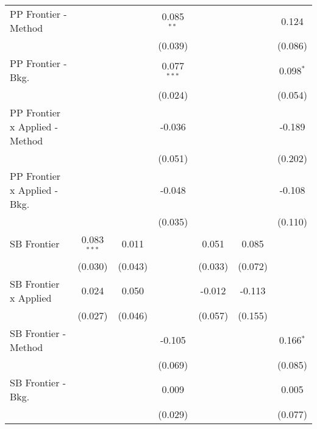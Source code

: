 \begin{tabular}{lcccccc}
   PP Frontier - Method           &               &               & 0.085$^{**}$  &               &              & 0.124\\   
                                  &               &               & (0.039)       &               &              & (0.086)\\   
   PP Frontier - Bkg.             &               &               & 0.077$^{***}$ &               &              & 0.098$^{*}$\\   
                                  &               &               & (0.024)       &               &              & (0.054)\\   
   PP Frontier x Applied - Method &               &               & -0.036        &               &              & -0.189\\   
                                  &               &               & (0.051)       &               &              & (0.202)\\   
   PP Frontier x Applied - Bkg.   &               &               & -0.048        &               &              & -0.108\\   
                                  &               &               & (0.035)       &               &              & (0.110)\\   
   SB Frontier                    & 0.083$^{***}$ & 0.011         &               & 0.051         & 0.085        &   \\   
                                  & (0.030)       & (0.043)       &               & (0.033)       & (0.072)      &   \\   
   SB Frontier x Applied          & 0.024         & 0.050         &               & -0.012        & -0.113       &   \\   
                                  & (0.027)       & (0.046)       &               & (0.057)       & (0.155)      &   \\   
   SB Frontier - Method           &               &               & -0.105        &               &              & 0.166$^{*}$\\   
                                  &               &               & (0.069)       &               &              & (0.085)\\   
   SB Frontier - Bkg.             &               &               & 0.009         &               &              & 0.005\\   
                                  &               &               & (0.029)       &               &              & (0.077)\\   

\end{tabular}
